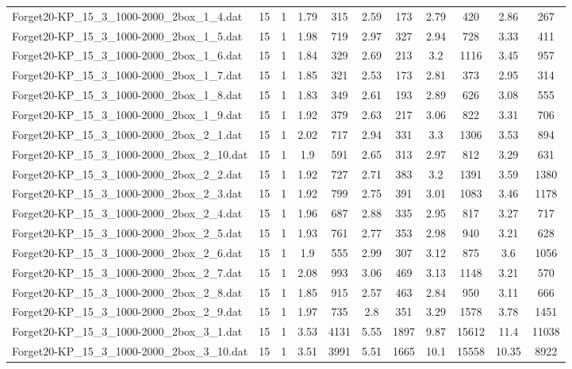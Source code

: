 \begin{table}[!ht]
\begin{tabular}{lcccccccccc}
Forget20-KP\_15\_3\_1000-2000\_2box\_1\_4.dat & 15 & 1 & 1.79 & 315 & 2.59 & 173 & 2.79 & 420 & 2.86 & 267 \\
Forget20-KP\_15\_3\_1000-2000\_2box\_1\_5.dat & 15 & 1 & 1.98 & 719 & 2.97 & 327 & 2.94 & 728 & 3.33 & 411 \\
Forget20-KP\_15\_3\_1000-2000\_2box\_1\_6.dat & 15 & 1 & 1.84 & 329 & 2.69 & 213 & 3.2 & 1116 & 3.45 & 957 \\
Forget20-KP\_15\_3\_1000-2000\_2box\_1\_7.dat & 15 & 1 & 1.85 & 321 & 2.53 & 173 & 2.81 & 373 & 2.95 & 314 \\
Forget20-KP\_15\_3\_1000-2000\_2box\_1\_8.dat & 15 & 1 & 1.83 & 349 & 2.61 & 193 & 2.89 & 626 & 3.08 & 555 \\
Forget20-KP\_15\_3\_1000-2000\_2box\_1\_9.dat & 15 & 1 & 1.92 & 379 & 2.63 & 217 & 3.06 & 822 & 3.31 & 706 \\
Forget20-KP\_15\_3\_1000-2000\_2box\_2\_1.dat & 15 & 1 & 2.02 & 717 & 2.94 & 331 & 3.3 & 1306 & 3.53 & 894 \\
Forget20-KP\_15\_3\_1000-2000\_2box\_2\_10.dat & 15 & 1 & 1.9 & 591 & 2.65 & 313 & 2.97 & 812 & 3.29 & 631 \\
Forget20-KP\_15\_3\_1000-2000\_2box\_2\_2.dat & 15 & 1 & 1.92 & 727 & 2.71 & 383 & 3.2 & 1391 & 3.59 & 1380 \\
Forget20-KP\_15\_3\_1000-2000\_2box\_2\_3.dat & 15 & 1 & 1.92 & 799 & 2.75 & 391 & 3.01 & 1083 & 3.46 & 1178 \\
Forget20-KP\_15\_3\_1000-2000\_2box\_2\_4.dat & 15 & 1 & 1.96 & 687 & 2.88 & 335 & 2.95 & 817 & 3.27 & 717 \\
Forget20-KP\_15\_3\_1000-2000\_2box\_2\_5.dat & 15 & 1 & 1.93 & 761 & 2.77 & 353 & 2.98 & 940 & 3.21 & 628 \\
Forget20-KP\_15\_3\_1000-2000\_2box\_2\_6.dat & 15 & 1 & 1.9 & 555 & 2.99 & 307 & 3.12 & 875 & 3.6 & 1056 \\
Forget20-KP\_15\_3\_1000-2000\_2box\_2\_7.dat & 15 & 1 & 2.08 & 993 & 3.06 & 469 & 3.13 & 1148 & 3.21 & 570 \\
Forget20-KP\_15\_3\_1000-2000\_2box\_2\_8.dat & 15 & 1 & 1.85 & 915 & 2.57 & 463 & 2.84 & 950 & 3.11 & 666 \\
Forget20-KP\_15\_3\_1000-2000\_2box\_2\_9.dat & 15 & 1 & 1.97 & 735 & 2.8 & 351 & 3.29 & 1578 & 3.78 & 1451 \\
Forget20-KP\_15\_3\_1000-2000\_2box\_3\_1.dat & 15 & 1 & 3.53 & 4131 & 5.55 & 1897 & 9.87 & 15612 & 11.4 & 11038 \\
Forget20-KP\_15\_3\_1000-2000\_2box\_3\_10.dat & 15 & 1 & 3.51 & 3991 & 5.51 & 1665 & 10.1 & 15558 & 10.35 & 8922 \\

\end{tabular}
\end{table}
